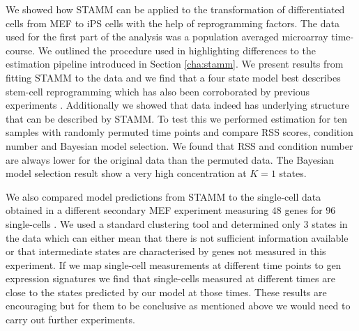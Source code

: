 We showed how STAMM can be applied to the transformation of differentiated cells from MEF to iPS cells with the help of reprogramming factors. The data used for the first part of the analysis was a population averaged microarray time-course. We outlined the procedure used in \cite{Armond:2013} highlighting differences to the estimation pipeline introduced in Section \ref{cha:stamm}. We present results from fitting STAMM to the data and we find that a four state model best describes stem-cell reprogramming which has also been corroborated by previous experiments \cite{SamavarchiTehrani:2010cp}. Additionally we showed that data indeed has underlying  structure that can be described by STAMM. To test this we performed estimation for ten samples with randomly permuted time points and compare RSS scores, condition number and Bayesian model selection. We found that RSS and condition number are always lower for the original data than the permuted data. The Bayesian model selection result show a very high concentration at $K=1$ states. 

We also compared model predictions from STAMM to the single-cell data obtained in a different secondary MEF experiment measuring $48$ genes for $96$ single-cells \citep{Buganim:2012hp}. We used a standard clustering tool and determined only $3$ states in the data which can either mean that there is not sufficient information available or that intermediate states are characterised by genes not measured in this experiment. If we map single-cell measurements at different time points to gen expression signatures we find that single-cells measured at different times are close to the states predicted by our model at those times. These results are encouraging but for them to be conclusive as mentioned above we would need to carry out further experiments. 



